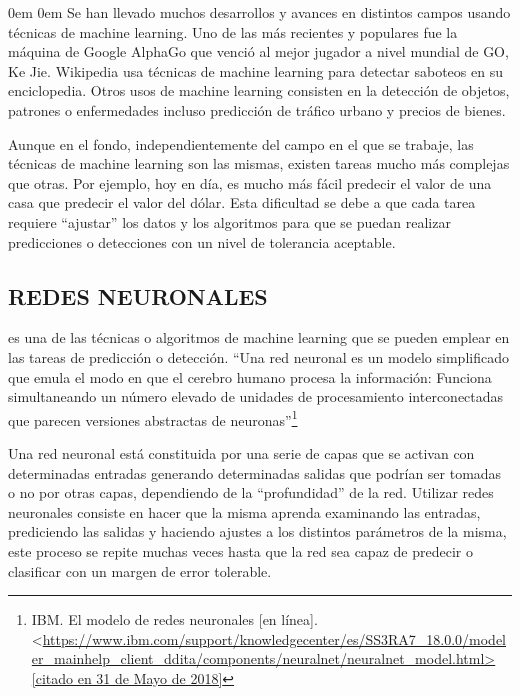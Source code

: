     \leftskip0em
    \rightskip0em
    Se han llevado muchos desarrollos y avances en distintos campos usando técnicas de machine learning. Uno de las más recientes y populares fue la máquina de Google AlphaGo que venció al mejor jugador a nivel mundial de GO, Ke Jie. Wikipedia usa técnicas de machine learning para detectar saboteos en su enciclopedia. Otros usos de machine learning consisten en la detección de objetos, patrones o enfermedades incluso predicción de tráfico urbano y precios de bienes.
    
    Aunque en el fondo, independientemente del campo en el que se trabaje, las técnicas de machine learning son las mismas, existen tareas mucho más complejas que otras. Por ejemplo, hoy en día, es mucho más fácil predecir el valor de una casa que predecir el valor del dólar. Esta dificultad se debe a que cada tarea requiere “ajustar” los datos y los algoritmos para que se puedan realizar predicciones o detecciones con un nivel de tolerancia aceptable.
    
    \subsection{REDES NEURONALES} es una de las técnicas o algoritmos de machine learning que se pueden emplear en las tareas de predicción o detección. “Una red neuronal es un modelo simplificado que emula el modo en que el cerebro humano procesa la información: Funciona simultaneando un número elevado de unidades de procesamiento interconectadas que parecen versiones abstractas de neuronas”\footnote[11]{IBM. El modelo de redes neuronales [en línea]. <\url{https://www.ibm.com/support/knowledgecenter/es/SS3RA7_18.0.0/modeler_mainhelp_client_ddita/components/neuralnet/neuralnet_model.html> [citado en 31 de Mayo de 2018]} }
    
  

  Una red neuronal está constituida por una serie de capas que se activan con determinadas entradas generando determinadas salidas que podrían ser tomadas o no por otras capas, dependiendo de la “profundidad” de la red. Utilizar redes neuronales consiste en hacer que la misma aprenda examinando las entradas, prediciendo las salidas y haciendo ajustes a los distintos parámetros de la misma, este proceso se repite muchas veces hasta que la red sea capaz de predecir o clasificar con un margen de error tolerable.
  
